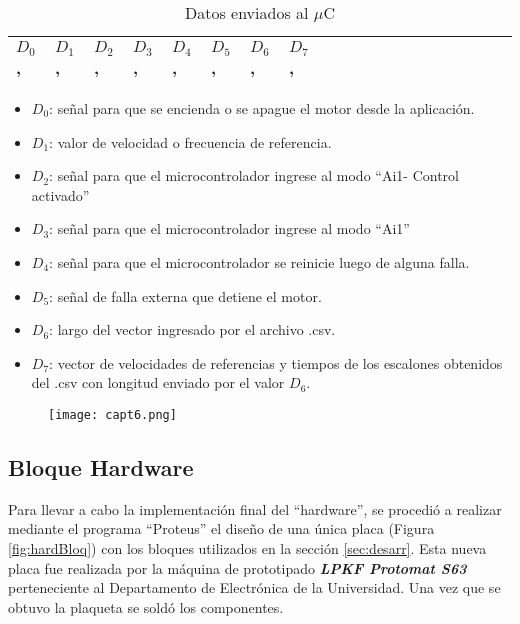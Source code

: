 \begin{enumerate}
\begin{table}[H]
	\centering
	\begin{tabular}{|l|l|l|l|l|l|l|l|l|l|l|l|l|l|l|l|l|l|l|l|}
		\hline
			$D_0$ , & $D_1$ , & $D_2$ , & $D_3$ , & $D_4$ , & $D_5$ , & $D_6$ ,  & $D_7$ , \\ \hline
	\end{tabular}
\caption{Datos enviados al $\mu$C}
\label{tab:Datosenviados}
\end{table}

\begin{itemize}
\item $D_0$: señal para que se encienda o se apague el motor desde la aplicación.
\item $D_1$: valor de velocidad o frecuencia de referencia.
\item $D_2$: señal para que el microcontrolador ingrese al modo “Ai1- Control activado”
\item $D_3$: señal para que el microcontrolador ingrese al modo “Ai1”
\item $D_4$: señal para que el microcontrolador se reinicie luego de alguna falla.
\item $D_5$: señal de falla externa que detiene el motor.
\item $D_6$: largo del vector ingresado por el archivo .csv.
\item $D_7$: vector de velocidades de referencias y tiempos de los escalones obtenidos del .csv con longitud enviado por el valor $D_6$.
\end{itemize}	

\end{enumerate}
\begin{figure}[H]
	\centering
	\texttt{[image: capt6.png]}
	\label{fig:capt6}
\end{figure}

\subsection{Bloque Hardware} \label{sec:hard}

Para llevar a cabo la implementación final del “hardware”, se procedió a realizar mediante el programa “Proteus” el diseño de una única placa (Figura \ref{fig:hardBloq}) con los bloques utilizados en la sección \ref{sec:desarr}. Esta nueva placa fue realizada por la máquina de prototipado \textbf{\textit{LPKF Protomat S63}} perteneciente al Departamento de Electrónica de la Universidad. Una vez que se obtuvo la plaqueta se soldó los componentes.  

